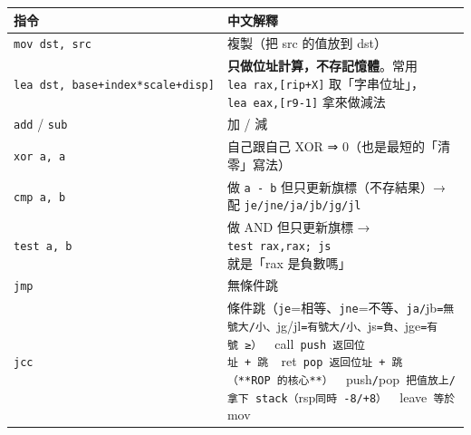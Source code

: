 \documentclass[10pt,a4paper]{article}
\newcounter{none}
\begin{document}
{\def\LTcaptype{none} %
\begin{longtable}[]{@{}
  >{\raggedright\arraybackslash}p{}
  >{\raggedright\arraybackslash}p{}@{}}
\toprule\noalign{}
\begin{minipage}[b]{\linewidth}\raggedright
指令
\end{minipage} & \begin{minipage}[b]{\linewidth}\raggedright
中文解釋
\end{minipage} \\
\midrule\noalign{}
\endhead
\bottomrule\noalign{}
\endlastfoot
\texttt{mov\ \allowbreak{}dst,\allowbreak{}\ \allowbreak{}src} & 複製（把 src 的值放到 dst） \\
\texttt{lea\ \allowbreak{}dst,\allowbreak{}\ \allowbreak{}{[}base+index*scale+disp{]}} &
\textbf{只做位址計算，不存記憶體}。常用 \texttt{lea\ \allowbreak{}rax,{[}rip+X{]}}
取「字串位址」，\texttt{lea\ \allowbreak{}eax,{[}r9-\allowbreak{}1{]}} 拿來做減法 \\
\texttt{add} / \texttt{sub} & 加 / 減 \\
\texttt{xor\ \allowbreak{}a,\allowbreak{}\ \allowbreak{}a} & 自己跟自己 XOR ⇒ 0（也是最短的「清零」寫法） \\
\texttt{cmp\ \allowbreak{}a,\allowbreak{}\ \allowbreak{}b} & 做 \texttt{a\ \allowbreak{}-\allowbreak{}\ \allowbreak{}b} 但只更新旗標（不存結果）→ 配
\texttt{je/\allowbreak{}jne/\allowbreak{}ja/\allowbreak{}jb/\allowbreak{}jg/\allowbreak{}jl} \\
\texttt{test\ \allowbreak{}a,\allowbreak{}\ \allowbreak{}b} & 做 AND 但只更新旗標 → \texttt{test\ \allowbreak{}rax,\allowbreak{}rax;\ \allowbreak{}js}
就是「rax 是負數嗎」 \\
\texttt{jmp} & 無條件跳 \\
\texttt{jcc} &
條件跳（\texttt{je}=相等、\texttt{jne}=不等、\texttt{ja/}jb\texttt{=無號大/\allowbreak{}小、}jg/jl\texttt{=有號大/\allowbreak{}小、}js\texttt{=負、}jge\texttt{=有號\ \allowbreak{}≥）\ \allowbreak{}\textbar{}\allowbreak{}\ \allowbreak{}\textbar{}\allowbreak{}}call\texttt{\textbar{}\allowbreak{}\ \allowbreak{}push\ \allowbreak{}返回位址\ \allowbreak{}+\ \allowbreak{}跳\ \allowbreak{}\textbar{}\allowbreak{}\ \allowbreak{}\textbar{}\allowbreak{}}ret\texttt{\textbar{}\allowbreak{}\ \allowbreak{}pop\ \allowbreak{}返回位址\ \allowbreak{}+\ \allowbreak{}跳（**ROP\ \allowbreak{}的核心**）\ \allowbreak{}\textbar{}\allowbreak{}\ \allowbreak{}\textbar{}\allowbreak{}}push\texttt{/}pop\texttt{\textbar{}\allowbreak{}\ \allowbreak{}把值放上/\allowbreak{}拿下\ \allowbreak{}stack（}rsp\texttt{同時\ \allowbreak{}-\allowbreak{}8/+8）\ \allowbreak{}\textbar{}\allowbreak{}\ \allowbreak{}\textbar{}\allowbreak{}}leave\texttt{\textbar{}\allowbreak{}\ \allowbreak{}等於}mov

\end{longtable}}
\end{document}
